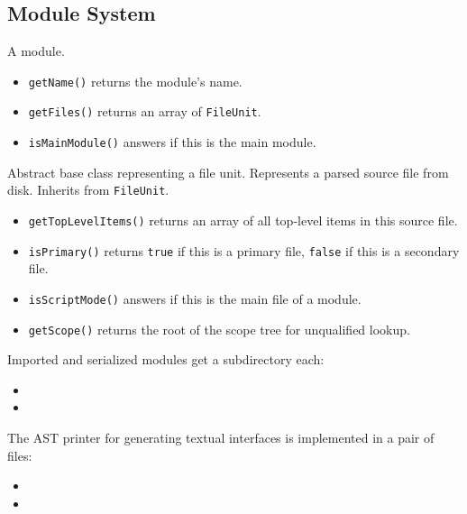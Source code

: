 \documentclass[../generics]{subfiles}
\begin{document}
\subsection*{Module System}
A module.
\begin{itemize}
\item \texttt{getName()} returns the module's name.
\item \texttt{getFiles()} returns an array of \texttt{FileUnit}.
\item \texttt{isMainModule()} answers if this is the main module.
\end{itemize}
Abstract base class representing a file unit.
Represents a parsed source file from disk. Inherits from \texttt{FileUnit}.
\begin{itemize}
\item \texttt{getTopLevelItems()} returns an array of all top-level items in this source file.
\item \texttt{isPrimary()} returns \texttt{true} if this is a primary file, \texttt{false} if this is a secondary file.
\item \texttt{isScriptMode()} answers if this is the main file of a module.
\item \texttt{getScope()} returns the root of the scope tree for unqualified lookup.
\end{itemize}

Imported and serialized modules get a subdirectory each:
\begin{itemize}
\item {}
\item {}
\end{itemize}
The AST printer for generating textual interfaces is implemented in a pair of files:
\begin{itemize}
\item {}
\item {}
\end{itemize}
\end{document}
